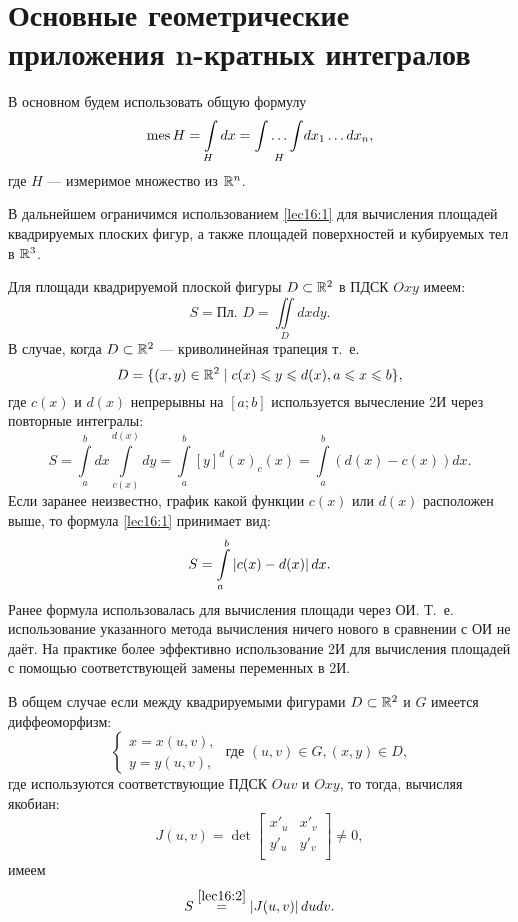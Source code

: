 \documentclass[../../main.tex]{subfiles}
\begin{document}
\section{Основные геометрические приложения n-кратных интегралов}

В основном будем использовать общую формулу
\begin{equation}
\label{lec16:1}
\operatorname{mes} H = \int\limits_Hdx = \underset{H}{\int \ldots \int}dx_1 \ldots dx_n,
\end{equation}
где $H$ --- измеримое множество из $\mathbb{R}^n$.

В дальнейшем ограничимся
использованием \eqref{lec16:1} для вычисления площадей квадрируемых плоских
фигур, а также площадей поверхностей и кубируемых тел в $\mathbb{R}^{3}$.

Для площади квадрируемой плоской фигуры $D \subset \mathbb{R}^{2}$ в ПДСК
$Oxy$ имеем:
\begin{equation}
\label{lec16:2}
S = \text{Пл. } D = \iint\limits_Ddxdy.
\end{equation}
В случае, когда $D \subset \mathbb{R}^{2}$ --- криволинейная трапеция т.~е. 
\begin{equation}
\label{lec16:3}
	D=\{
	(x,y)\in \mathbb{R}^2 \mid c(x)\leqslant y\leqslant d(x), a\leqslant x \leqslant b
	\},
\end{equation}
где $c(x)$ и $d(x)$ непрерывны на $\left[a; b\right]$
 используется вычесление 2И через повторные интегралы:
\begin{equation}
\label{lec16:4}
S = \int\limits_a^bdx\int\limits_{c(x)}^{d(x)}dy = 
\int\limits_a^b\left[y\right]^d(x)_c(x)
=\int\limits_a^b(d(x) - c(x))dx.
\end{equation}
Если заранее неизвестно, график какой функции  $c(x)$ или $d(x)$ 
расположен выше, то формула \eqref{lec16:1} принимает вид:
\begin{equation}
\label{lec16:5}
S =  \int\limits_a^b\left|{c(x) - d(x)}\right|dx.
\end{equation}
Ранее формула использовалась для вычисления
 площади через ОИ. Т.~е. использование
  указанного метода вычисления {ничего нового}
в сравнении с ОИ не даёт. На практике
 более эффективно использование 2И для
  вычисления площадей с помощью соответствующей замены переменных в 2И.


В общем случае если между квадрируемыми фигурами 
$D\subset \mathbb{R}^2$ и $G$ имеется диффеоморфизм:
\begin{equation*}
\begin{cases}
x = x(u, v), \\
y = y(u, v),
\end{cases}
\text{ где }  (u, v) \in G, (x, y) \in D,
\end{equation*}
где используются соответствующие ПДСК $Ouv$ и $Oxy$, 
то тогда, вычисляя якобиан:
\begin{equation*}
J(u,v) = \det
\begin{bmatrix}
x'_u & x'_v\\
y'_u & y'_v\\
\end{bmatrix}
\neq 0,
\end{equation*}
имеем
\begin{equation}
\label{lec16:6}
S \overset{\ref{lec16:2}}{=}  \left|{ J(u,v)}\right| dudv.
\end{equation}
\end{document}
